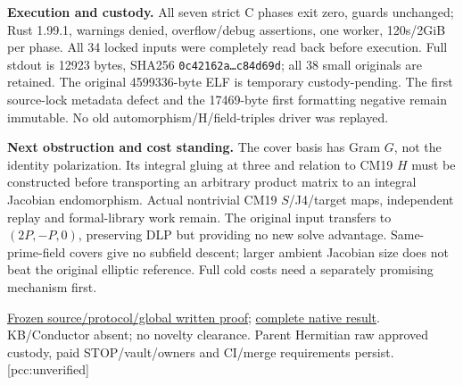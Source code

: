 \documentclass[10pt,a4paper]{article}
\begin{document}
\textbf{Execution and custody.} All seven strict C phases exit zero,
guards unchanged; Rust 1.99.1, warnings denied, overflow/debug assertions,
one worker, 120s/2GiB per phase. All 34 locked inputs were completely read
back before execution. Full stdout is 12923 bytes, SHA256
\texttt{0c42162a\ldots c84d69d}; all 38 small originals are retained.
The original 4599336-byte ELF is temporary custody-pending. The first
source-lock metadata defect and the 17469-byte first formatting negative
remain immutable. No old automorphism/H/field-triples driver was replayed.

\textbf{Next obstruction and cost standing.} The cover basis has Gram $G$,
not the identity polarization. Its integral gluing at three and relation
to CM19 $H$ must be constructed before transporting an arbitrary product
matrix to an integral Jacobian endomorphism. Actual nontrivial CM19
$S$/J4/target maps, independent replay and formal-library work remain.
The original input transfers to $(2P,-P,0)$, preserving DLP but providing
no new solve advantage. Same-prime-field covers give no subfield descent;
larger ambient Jacobian size does not beat the original elliptic reference.
Full cold costs need a separately promising mechanism first.

\href{https://github.com/isogeny-labs/crypto/tree/746db9161fe54d85a621a7303abe013fd2a33535/research/chained_cm19_jacobian_gram_20261123}{Frozen source/protocol/global written proof};
\href{https://github.com/isogeny-labs/crypto/tree/c875d22a619c363b3974a5d338943bf26de421f9/research/chained_cm19_jacobian_gram_20261123}{complete native result}.
KB/Conductor absent; no novelty clearance. Parent Hermitian raw approved
custody, paid STOP/vault/owners and CI/merge requirements persist.
[pcc:unverified]
\end{document}
